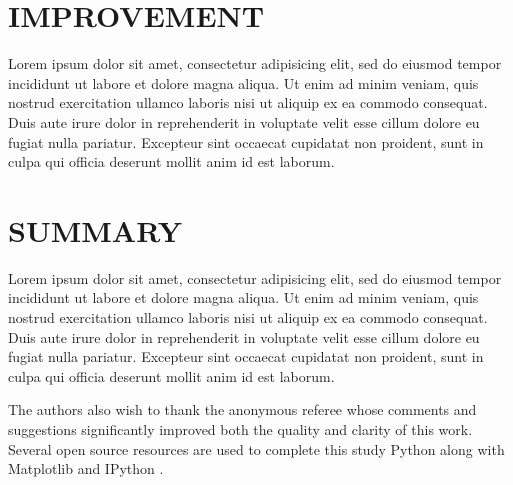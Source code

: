 \documentclass[apj, revtex4]{emulateapj}
\begin{document}
\section{IMPROVEMENT}
Lorem ipsum dolor sit amet, consectetur adipisicing elit, sed do eiusmod tempor incididunt ut labore et dolore magna aliqua. Ut enim ad minim veniam, quis nostrud exercitation ullamco laboris nisi ut aliquip ex ea commodo consequat. Duis aute irure dolor in reprehenderit in voluptate velit esse cillum dolore eu fugiat nulla pariatur. Excepteur sint occaecat cupidatat non proident, sunt in culpa qui officia deserunt mollit anim id est laborum.

\section{SUMMARY}
Lorem ipsum dolor sit amet, consectetur adipisicing elit, sed do eiusmod tempor incididunt ut labore et dolore magna aliqua. Ut enim ad minim veniam, quis nostrud exercitation ullamco laboris nisi ut aliquip ex ea commodo consequat. Duis aute irure dolor in reprehenderit in voluptate velit esse cillum dolore eu fugiat nulla pariatur. Excepteur sint occaecat cupidatat non proident, sunt in culpa qui officia deserunt mollit anim id est laborum.

\acknowledgments 
The authors also wish to thank the anonymous referee whose comments and
suggestions significantly improved both the quality and clarity of this work. Several open source resources are used to complete this study Python \citep{van1991} along with Matplotlib \citep{Hunter2007} and IPython \citep{Perez2007}.


\end{document}
